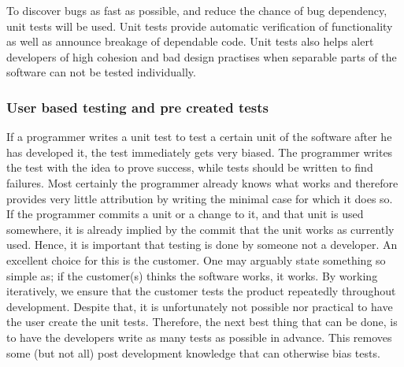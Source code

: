 \documentclass{article}
\begin{document}
To discover bugs as fast as possible, and reduce the chance of bug dependency, unit tests will be used.
Unit tests provide automatic verification of functionality as well as announce breakage of dependable code.
Unit tests also helps alert developers of high cohesion and bad design practises when separable parts of the software can not be tested individually.

\subsubsection{User based testing and pre created tests}
If a programmer writes a unit test to test a certain unit of the software after he has developed it, the test immediately gets very biased.
The programmer writes the test with the idea to prove success, while tests should be written to find failures.
Most certainly the programmer already knows what works and therefore provides very little attribution by writing the minimal case for which it does so. 
If the programmer commits a unit or a change to it, and that unit is used somewhere, it is already implied by the commit that the unit works as currently used.
Hence, it is important that testing is done by someone not a developer.
An excellent choice for this is the customer.
One may arguably state something so simple as; if the customer(s) thinks the software works, it works.
By working iteratively, we ensure that the customer tests the product repeatedly throughout development.
Despite that, it is unfortunately not possible nor practical to have the user create the unit tests.
Therefore, the next best thing that can be done, is to have the developers write as many tests as possible in advance.
This removes some (but not all) post development knowledge that can otherwise bias tests.
\end{document}
